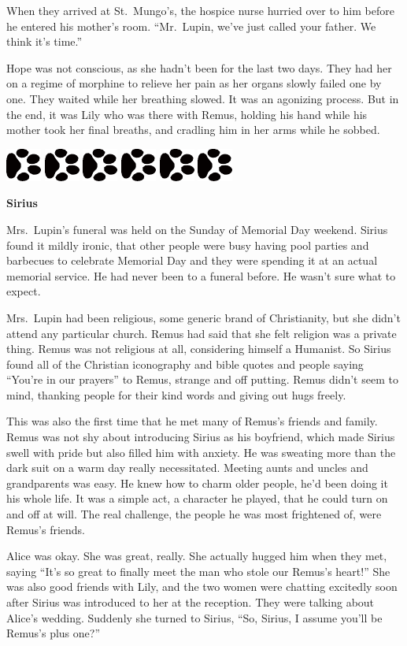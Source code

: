 \documentclass[12pt,twoside,openright]{memoir}
\newcommand{\dogPrintRule}{	
	\begin{center}
		\hspace{.5em}
		\includegraphics[angle=60]{dogprint.pdf}
		\hspace{.5em}
		\includegraphics[angle=120]{dogprint.pdf}
		\hspace{.5em}
		\includegraphics[angle=60]{dogprint.pdf}
		\hspace{.5em}
		\includegraphics[angle=120]{dogprint.pdf}
		\hspace{.5em}
		\includegraphics[angle=60]{dogprint.pdf}
		\hspace{.5em}
		\includegraphics[angle=120]{dogprint.pdf}
		\hspace{.5em}
	\end{center}
}
\begin{document}
When they arrived at St.\ Mungo's, the hospice nurse hurried over to him before he entered his mother's room. ``Mr.\ Lupin, we've just called your father. We think it's time.''

Hope was not conscious, as she hadn't been for the last two days. They had her on a regime of morphine to relieve her pain as her organs slowly failed one by one. They waited while her breathing slowed. It was an agonizing process. But in the end, it was Lily who was there with Remus, holding his hand while his mother took her final breaths, and cradling him in her arms while he sobbed.

\dogPrintRule

\textbf{Sirius} 

Mrs.\ Lupin's funeral was held on the Sunday of Memorial Day weekend. Sirius found it mildly ironic, that other people were busy having pool parties and barbecues to celebrate Memorial Day and they were spending it at an actual memorial service. He had never been to a funeral before. He wasn't sure what to expect.

Mrs.\ Lupin had been religious, some generic brand of Christianity, but she didn't attend any particular church. Remus had said that she felt religion was a private thing. Remus was not religious at all, considering himself a Humanist. So Sirius found all of the Christian iconography and bible quotes and people saying ``You're in our prayers'' to Remus, strange and off putting. Remus didn't seem to mind, thanking people for their kind words and giving out hugs freely. 

This was also the first time that he met many of Remus's friends and family. Remus was not shy about introducing Sirius as his boyfriend, which made Sirius swell with pride but also filled him with anxiety. He was sweating more than the dark suit on a warm day really necessitated. Meeting aunts and uncles and grandparents was easy. He knew how to charm older people, he'd been doing it his whole life. It was a simple act, a character he played, that he could turn on and off at will. The real challenge, the people he was most frightened of, were Remus's friends.

Alice was okay. She was great, really. She actually hugged him when they met, saying ``It's so great to finally meet the man who stole our Remus's heart!'' She was also good friends with Lily, and the two women were chatting excitedly soon after Sirius was introduced to her at the reception. They were talking about Alice's wedding. Suddenly she turned to Sirius, ``So, Sirius, I assume you'll be Remus's plus one?''
\end{document}
